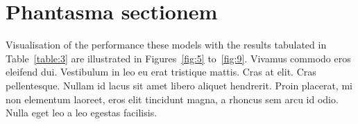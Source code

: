 \documentclass[preprint,3p,times,twocolumn]{elsarticle}  %
\begin{document}
\section{Phantasma sectionem}
Visualisation of the performance these models with the results tabulated in 
Table~\ref{table:3} are illustrated in Figures~\ref{fig:5} to~\ref{fig:9}.
Vivamus commodo eros eleifend dui.  Vestibulum in leo eu erat tristique 
mattis. Cras at elit.  Cras pellentesque. Nullam id lacus sit amet libero 
aliquet hendrerit. Proin placerat, mi non elementum laoreet, eros elit tincidunt 
magna, a rhoncus sem arcu id odio. Nulla eget leo a leo egestas facilisis.
\end{document}
